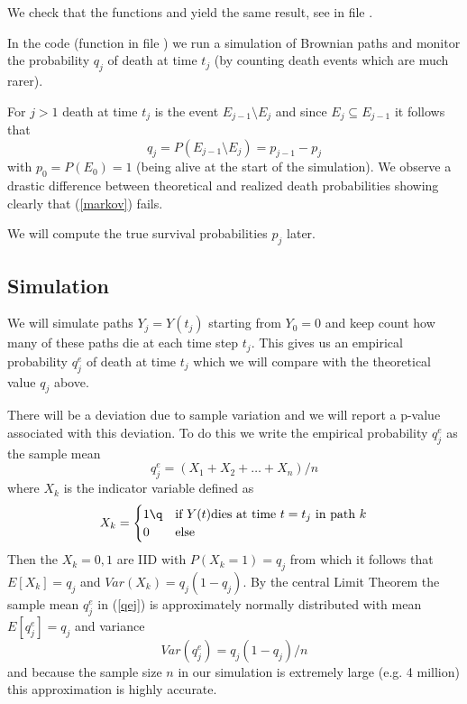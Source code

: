 We check that the functions  and  yield the same 
result, see  in file .

In the code (function  in file )
we run a simulation of Brownian paths and monitor the probability $q_j$ of 
death at time $t_j$ (by counting death events which are much rarer). 

For $j>1$ death at time $t_j$
is the event $E_{j-1}\setminus E_j$ and since $E_j\subseteq E_{j-1}$ it follows
that
%
\begin{equation}
\label{qj}
q_j=P(E_{j-1}\setminus E_j) = p_{j-1}-p_j
\end{equation}
%
with $p_0=P(E_0)=1$ (being alive at the start of the simulation).
We observe a drastic difference between theoretical and realized death
probabilities showing clearly that (\ref{markov}) fails.

We will compute the true survival probabilities $p_j$ later.

\subsection{Simulation}

We will simulate paths $Y_j=Y(t_j)$ starting from $Y_0=0$ and keep count how
many of these paths die at each time step $t_j$. This gives us an empirical 
probability $q^e_j$ of death at time $t_j$ which we will compare with the theoretical value $q_j$ above.

There will be a deviation due to sample variation and we will report a p-value
associated with this deviation. To do this we write the empirical probability
$q^e_j$ as the sample mean
%
\begin{equation}
\label{qej}
q^e_j=(X_1+X_2+\dots+X_n)/n
\end{equation}
%
where $X_k$ is the indicator variable defined as
$$
X_k=
\begin{cases}
1\q&\text{if }Y(t)\text{dies at time $t=t_j$ in path $k$}\\
0 &\text{else}
\end{cases}
$$
Then the $X_k=0,1$ are IID with $P(X_k=1)=q_j$ from which it follows that
$E[X_k]=q_j$ and $Var(X_k)=q_j(1-q_j)$. By the central Limit Theorem the sample
mean $q^e_j$ in (\ref{qej}) is approximately normally distributed with mean
$E[q^e_j]=q_j$ and variance 
$$
Var(q^e_j)=q_j(1-q_j)/n
$$ 
and because the sample 
size $n$ in our simulation is extremely large (e.g. 4 million) this 
approximation is highly accurate.

